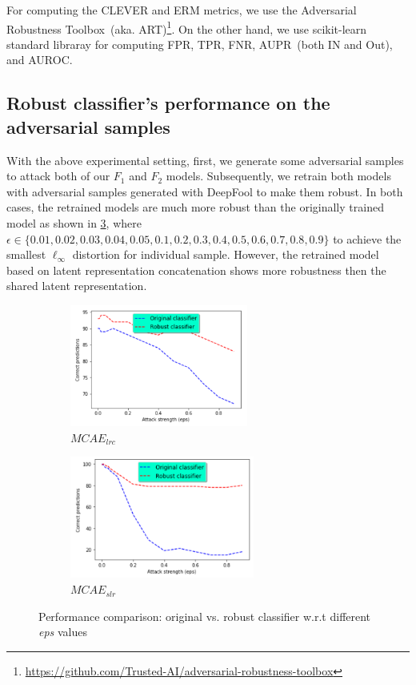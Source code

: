 \hspace*{3.5mm} For computing the CLEVER and ERM metrics, we use the Adversarial Robustness Toolbox~(aka. ART)\footnote{\url{https://github.com/Trusted-AI/adversarial-robustness-toolbox}}. On the other hand, we use scikit-learn standard libraray for computing FPR, TPR, FNR, AUPR~(both IN and Out), and AUROC. 

\subsection{Robust classifier's performance on the adversarial samples}
With the above experimental setting, first, we generate some adversarial samples to attack both of our $F_1$ and $F_2$ models. Subsequently, we retrain both models with adversarial samples generated with DeepFool to make them robust. In both cases, the retrained models are much more robust than the originally trained model as shown in \cref{fig:normal_vs_robust_models}, where $\epsilon \in\{0.01, 0.02, 0.03, 0.04, 0.05, 0.1, 0.2, 0.3, 0.4, 0.5, 0.6, 0.7, 0.8, 0.9\}$ to achieve the smallest $\ell_{\infty}$ distortion for individual sample. However, the retrained model based on latent representation concatenation shows more robustness then the shared latent representation. 

\begin{figure}[h]
	\centering
	\begin{subfigure}{.48\linewidth}
		\centering
		\includegraphics[width=0.8\linewidth,height=40mm]{images/adversarial_training_1.png}
		\caption{$MCAE_{lrc}$}
        \label{fig:normal_vs_robust_f1}
	\end{subfigure}
	\begin{subfigure}{0.48\linewidth}
		\centering
		\includegraphics[width=0.8\linewidth,height=40mm]{images/adversarial_training_2.png}
		\caption{$MCAE_{slr}$}
        \label{fig:normal_vs_robust_f2}
	\end{subfigure}
	\caption{Performance comparison: original vs.  robust classifier w.r.t  different \textit{eps} values} 
	\label{fig:normal_vs_robust_models}
\end{figure}

